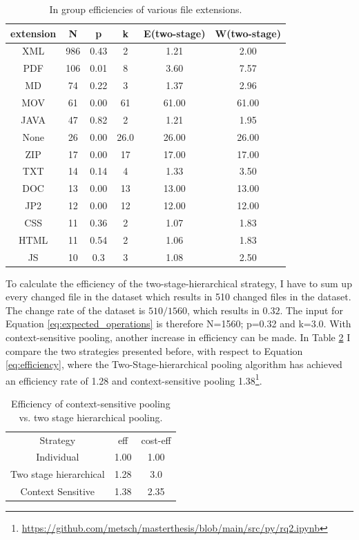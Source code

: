 \begin{table}[t]
    \centering
    \begin{tabular}{ c c c c c c}
        extension & N & p & k & E(\acrshort{two-stage}) & W(\acrshort{two-stage}) \\
        \hline
        XML & 986 & 0.43 & 2 & 1.21  & 2.00 \\  
        \hline
        PDF &106 &0.01 & 8 &  3.60 & 7.57 \\
        \hline
        MD & 74 & 0.22  & 3 & 1.37 & 2.96 \\    
        \hline
        MOV&61 & 0.00 &  61 & 61.00 & 61.00 \\  
     \hline
     JAVA &47 &0.82 & 2  & 1.21 & 1.95 \\  
     \hline
     None & 26 & 0.00 & 26.0 & 26.00 & 26.00	 \\
     \hline
     ZIP & 17 &0.00 &  17 & 17.00 & 17.00 \\
     \hline
     TXT & 14 & 0.14 &  4 & 1.33 & 3.50 \\ 
     \hline
     DOC & 13 & 0.00 &  13 & 13.00 & 13.00 \\   
     \hline
     JP2 & 12 & 0.00 &  12 & 12.00 & 12.00 \\   
     \hline
     CSS & 11 & 0.36 & 2  & 1.07 & 1.83 \\  
     \hline
     HTML & 11 & 0.54 &  2 & 1.06 & 1.83
     \\   
     \hline
     JS & 10 & 0.3 & 3& 1.08 & 2.50
    \end{tabular}
    \caption{In group efficiencies of various file extensions.}
    \label{tb:efficiency}
\end{table}

To calculate the efficiency of the two-stage-hierarchical strategy, I have to sum up every changed file in the dataset which results in 510 changed files in the dataset. The change rate of the dataset is $510/1560$, which results in $0.32$. The input for Equation \ref{eq:expected_operations} is therefore N=1560; p=0.32 and k=3.0.
With context-sensitive pooling, another increase in efficiency can be made. In Table \ref{tb:context-sensitive} I compare the two strategies presented before, with respect to Equation \ref{eq:efficiency}, where the Two-Stage-hierarchical pooling algorithm has achieved an efficiency rate of 1.28 and context-sensitive pooling 1.38\footnote{\url{https://github.com/metsch/masterthesis/blob/main/src/py/rq2.ipynb}}. 
\begin{table}[t]
    \centering
    \begin{tabular}{c c c}
        Strategy & \acrshort{eff} & \acrshort{cost-eff} \\
        Individual & 1.00 & 1.00 \\
        Two stage hierarchical &  1.28 & 3.0\\
        Context Sensitive & 1.38 & 2.35
    \end{tabular}
    \caption{Efficiency of context-sensitive pooling vs. two stage hierarchical pooling.}
    \label{tb:context-sensitive}
\end{table}

